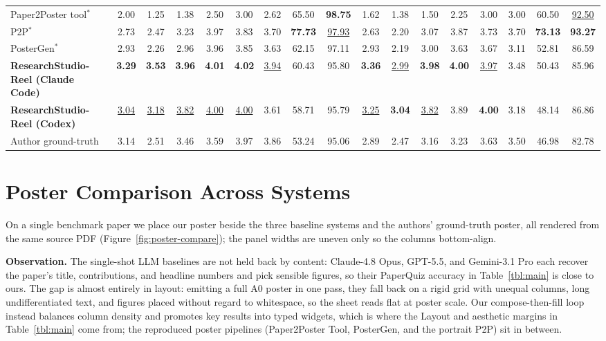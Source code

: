\documentclass{article}
\newcommand{\reelword}{\textcolor{msred}{R}\textcolor{msgreen}{e}\textcolor{msblue}{e}\textcolor{msyellow}{l}}
\begin{document}
\begin{table}[H]
{\begin{tabular}{@{}l cccccc cc @{\hskip 5pt}|@{\hskip 5pt} cccccc cc@{}}
Paper2Poster tool$^{\ast}$ \citep{paper2poster} & 2.00 & 1.25 & 1.38 & 2.50 & 3.00 & 2.62 & 65.50 & \textbf{98.75} & 1.62 & 1.38 & 1.50 & 2.25 & 3.00 & 3.00 & 60.50 & \underline{92.50} \\
P2P$^{\ast}$ \citep{p2p} & 2.73 & 2.47 & 3.23 & 3.97 & 3.83 & 3.70 & \textbf{77.73} & \underline{97.93} & 2.63 & 2.20 & 3.07 & 3.87 & 3.73 & 3.70 & \textbf{73.13} & \textbf{93.27} \\
PosterGen$^{\ast}$ \citep{postergen} & 2.93 & 2.26 & 2.96 & 3.96 & 3.85 & 3.63 & 62.15 & 97.11 & 2.93 & 2.19 & 3.00 & 3.63 & 3.67 & 3.11 & 52.81 & 86.59 \\
\textbf{ResearchStudio-\reelword{} (Claude Code)} & \textbf{3.29} & \textbf{3.53} & \textbf{3.96} & \textbf{4.01} & \textbf{4.02} & \underline{3.94} & 60.43 & 95.80 & \textbf{3.36} & \underline{2.99} & \textbf{3.98} & \textbf{4.00} & \underline{3.97} & 3.48 & 50.43 & 85.96 \\
\textbf{ResearchStudio-\reelword{} (Codex)} & \underline{3.04} & \underline{3.18} & \underline{3.82} & \underline{4.00} & \underline{4.00} & 3.61 & 58.71 & 95.79 & \underline{3.25} & \textbf{3.04} & \underline{3.82} & 3.89 & \textbf{4.00} & 3.18 & 48.14 & 86.86 \\
\midrule
Author ground-truth & 3.14 & 2.51 & 3.46 & 3.59 & 3.97 & 3.86 & 53.24 & 95.06 & 2.89 & 2.47 & 3.16 & 3.23 & 3.63 & 3.50 & 46.98 & 82.78 \\
\bottomrule
\end{tabular}}
\end{table}

\section{Poster Comparison Across Systems}\label{app:compare}
On a single benchmark paper we place our poster beside the three baseline systems and the authors' ground-truth poster, all rendered from the same source PDF (Figure~\ref{fig:poster-compare}); the panel widths are uneven only so the columns bottom-align.

\textbf{Observation.} The single-shot LLM baselines are not held back by content: Claude-4.8 Opus, GPT-5.5, and Gemini-3.1 Pro each recover the paper's title, contributions, and headline numbers and pick sensible figures, so their PaperQuiz accuracy in Table~\ref{tbl:main} is close to ours. The gap is almost entirely in layout: emitting a full A0 poster in one pass, they fall back on a rigid grid with unequal columns, long undifferentiated text, and figures placed without regard to whitespace, so the sheet reads flat at poster scale. Our compose-then-fill loop instead balances column density and promotes key results into typed widgets, which is where the Layout and aesthetic margins in Table~\ref{tbl:main} come from; the reproduced poster pipelines (Paper2Poster Tool, PosterGen, and the portrait P2P) sit in between.
\end{document}

